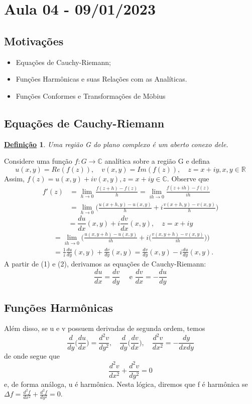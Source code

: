 \documentclass{article}
\newtheorem*{def*}{\underline{Defini\c c\~ao}}
\begin{document}
  \section{Aula 04 - 09/01/2023}
  \subsection{Motiva\c c\~oes}
  \begin{itemize}
    \item Equa\c c\~oes de Cauchy-Riemann;
    \item Fun\c c\~oes Harm\^onicas e suas Rela\c c\~oes com as Anal\'iticas.
    \item Fun\c c\~oes Conformes e Transforma\c c\~oes de M\"{o}bius
  \end{itemize}
  \subsection{Equa\c c\~oes de Cauchy-Riemann}
  \begin{def*}
    Uma regi\~ao G do plano complexo \'e um aberto conexo dele.
  \end{def*}
  Considere uma fun\c c\~ao $f:G\rightarrow \mathbb{C}$ anal\'itica sobre a regi\~ao G e defina
  $$
  u(x, y) = Re(f(z)), \quad v(x, y) = Im(f(z)), \quad z=x+iy, x, y\in \mathbb{R}
  $$
  Assim, $f(z) = u(x, y) + iv(x, y), z=x+iy\in \mathbb{C}.$ Observe que 
  \begin{align*} 
    f'(z) &= \lim _{h\to{0}}\frac{f(z+h) - f(z)}{h} = \lim _{ih\to{0}}\frac{f(z+ih) - f(z)}{ih} \\
          &= \lim _{h\to{0}}\biggl(\frac{u(x+h, y) - u(x, y)}{h} + i\frac{v(x + h, y) - v(x, y)}{h}\biggr)
  \end{align*} 
  \begin{equation}
    = \frac{du}{dx}(x, y) + i \frac{dv}{dx}(x, y), \quad z = x + iy  
  \end{equation}
  \begin{align}
 &= \lim _{ih\to{0}}\biggl(\frac{u(x, y+h) - u(x, y)}{ih} + i\biggl(\frac{v(x, y+h) - v(x, y)}{ih}\biggr)\biggr) \nonumber\\
 &= \frac{1}{i}\frac{du}{dy}(x, y) + \frac{dv}{dy}(x, y) = \frac{dv}{dy}(x, y) - i \frac{du}{dy}(x, y).
  \end{align}
  A partir de (1) e (2), derivamos as equa\c c\~oes de Cauchy-Riemann:
  $$
  \boxed{\frac{du}{dx}=\frac{dv}{dy} \quad \text{ e } \frac{dv}{dx} = -\frac{du}{dy}}
  $$
  \subsection{Fun\c c\~oes Harm\^onicas}
  Al\'em disso, se u e v possuem derivadas de segunda ordem, temos
  $$
  \frac{d}{dy}\biggl(\frac{du}{dx}\biggr) = \frac{d^2v}{dy^2}, \quad \frac{d}{dy}\biggl(\frac{dv}{dx}\biggr), \quad \frac{d^2v}{dx^2} = -\frac{dy}{dxdy}
  $$
  de onde segue que 
  $$
  \frac{d^2v}{dx^2} + \frac{d^2v}{dy^2} = 0
  $$
  e, de forma an\'aloga, u \'e harm\^onica. Nesta l\'ogica, diremos que f \'e harm\^onica
  se $\Delta f = \frac{d^2f}{dx^2} + \frac{d^2f}{dy^2} = 0.$
\end{document}
